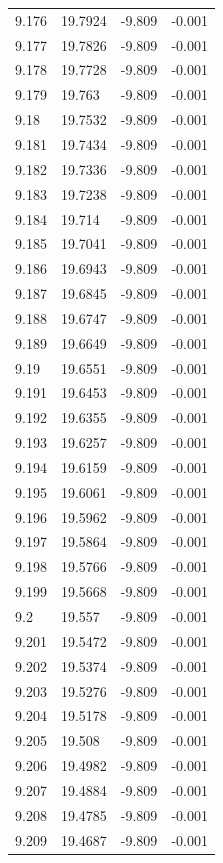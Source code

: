 \begin{tabular}{llll}
9.176 & 19.7924 & -9.809 & -0.001 \\
9.177 & 19.7826 & -9.809 & -0.001 \\
9.178 & 19.7728 & -9.809 & -0.001 \\
9.179 & 19.763 & -9.809 & -0.001 \\
9.18 & 19.7532 & -9.809 & -0.001 \\
9.181 & 19.7434 & -9.809 & -0.001 \\
9.182 & 19.7336 & -9.809 & -0.001 \\
9.183 & 19.7238 & -9.809 & -0.001 \\
9.184 & 19.714 & -9.809 & -0.001 \\
9.185 & 19.7041 & -9.809 & -0.001 \\
9.186 & 19.6943 & -9.809 & -0.001 \\
9.187 & 19.6845 & -9.809 & -0.001 \\
9.188 & 19.6747 & -9.809 & -0.001 \\
9.189 & 19.6649 & -9.809 & -0.001 \\
9.19 & 19.6551 & -9.809 & -0.001 \\
9.191 & 19.6453 & -9.809 & -0.001 \\
9.192 & 19.6355 & -9.809 & -0.001 \\
9.193 & 19.6257 & -9.809 & -0.001 \\
9.194 & 19.6159 & -9.809 & -0.001 \\
9.195 & 19.6061 & -9.809 & -0.001 \\
9.196 & 19.5962 & -9.809 & -0.001 \\
9.197 & 19.5864 & -9.809 & -0.001 \\
9.198 & 19.5766 & -9.809 & -0.001 \\
9.199 & 19.5668 & -9.809 & -0.001 \\
9.2 & 19.557 & -9.809 & -0.001 \\
9.201 & 19.5472 & -9.809 & -0.001 \\
9.202 & 19.5374 & -9.809 & -0.001 \\
9.203 & 19.5276 & -9.809 & -0.001 \\
9.204 & 19.5178 & -9.809 & -0.001 \\
9.205 & 19.508 & -9.809 & -0.001 \\
9.206 & 19.4982 & -9.809 & -0.001 \\
9.207 & 19.4884 & -9.809 & -0.001 \\
9.208 & 19.4785 & -9.809 & -0.001 \\
9.209 & 19.4687 & -9.809 & -0.001 \\

\end{tabular}
